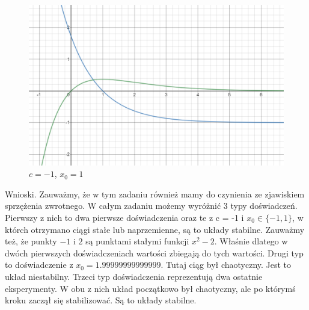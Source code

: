 \documentclass[]{article}
\begin{document}
\begin{figure}[!htbp]
	\includegraphics[scale=1]{e1-x-1andxe-x.png}
	\centering
	\caption{$c = -1$, $x_0 = 1$}
\end{figure}



Wnioski. Zauważmy, że w tym zadaniu również mamy do czynienia ze zjawiskiem sprzężenia zwrotnego. W całym zadaniu możemy wyróżnić 3 typy doświadczeń. Pierwszy z nich to dwa pierwsze doświadczenia oraz te z c = -1 i $x_0 \in \{-1,1\}$, w którch otrzymano ciągi stałe lub naprzemienne, są to układy stabilne. Zauważmy też, że punkty $-1$ i $2$ są punktami stałymi funkcji $x^2 - 2$. Właśnie dlatego w dwóch pierwszych doświadczeniach wartości zbiegają do tych wartości. Drugi typ to doświadczenie z $x_0 = 1.99999999999999$. Tutaj ciąg był chaotyczny. Jest to układ niestabilny. Trzeci typ doświadczenia reprezentują dwa ostatnie eksperymenty. W obu z nich układ początkowo był chaotyczny, ale po którymś kroku zaczął się stabilizować. Są to układy stabilne.
\end{document}
